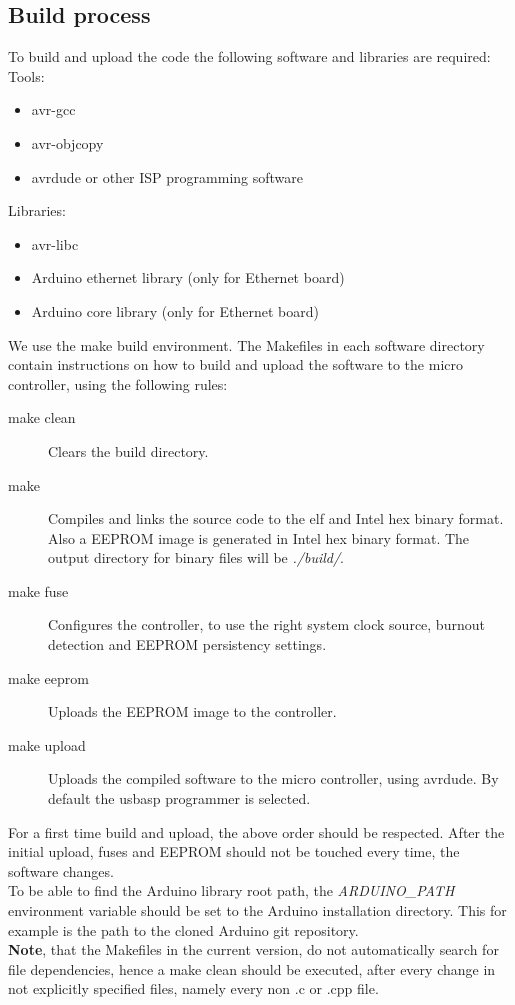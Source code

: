 \documentclass[a4paper]{scrreprt}
\begin{document}
\subsection{Build process}
To build and upload the code the following software and libraries are required:\\
Tools:
\begin{itemize}
  \item avr-gcc
  \item avr-objcopy
  \item avrdude or other ISP programming software
\end{itemize}
Libraries:
\begin{itemize}
  \item avr-libc
  \item Arduino ethernet library (only for Ethernet board)
  \item Arduino core library (only for Ethernet board)
\end{itemize}
We use the make build environment. The Makefiles in each software directory contain instructions on how to build and upload the software to the micro controller, using the following rules:
\begin{description}
  \item[make clean] Clears the build directory.
  \item[make] Compiles and links the source code to the elf and Intel hex binary format. Also a EEPROM image is generated in Intel hex binary format. The output directory for binary files will be \emph{./build/}.
  \item[make fuse] Configures the controller, to use the right system clock source, burnout detection and EEPROM persistency settings.
  \item[make eeprom] Uploads the EEPROM image to the controller.
  \item[make upload] Uploads the compiled software to the micro controller, using avrdude. By default the usbasp programmer is selected.
\end{description}
For a first time build and upload, the above order should be respected. After the initial upload, fuses and EEPROM should not be touched every time, the software changes.\\
To be able to find the Arduino library root path, the \emph{ARDUINO\_PATH} environment variable should be set to the Arduino installation directory. This for example is the path to the cloned Arduino git repository.\\
\textbf{Note}, that the Makefiles in the current version, do not automatically search for file dependencies, hence a make clean should be executed, after every change in not explicitly specified files, namely every non .c or .cpp file.
\end{document}
